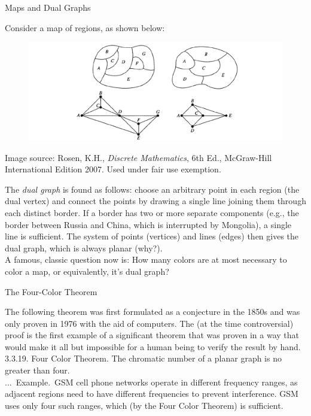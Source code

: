 \documentclass[smaller,hyperref={CJKbookmarks=true}]{beamer}
\newcounter{zhuo}[subsection]
\renewcommand{\thezhuo}{\thesection.\thesubsection.\arabic{zhuo}}
\newenvironment{EXAMPLE}{\stepcounter{zhuo}\alert{\!\thezhuo.~Example.\,}}{}
\begin{document}
\begin{frame}{Maps and Dual Graphs}
\begin{spacing}{1.1}
\vspace*{8pt}
Consider a map of regions, as shown below:
\begin{figure}
  \centering
  \includegraphics[width=\textwidth]{graph2}
\end{figure}
\begin{center}
\begin{spacing}{0.5}
\begin{tiny}
Image source: Rosen, K.H., \emph{Discrete Mathematics}, 6th Ed., McGraw-Hill International Edition 2007. Used under fair use
exemption.
\end{tiny}
\end{spacing}
\end{center}
\newpage
The \emph{dual graph} is found as follows: choose an arbitrary point in each
region (the dual vertex) and connect the points by drawing a single line
joining them through each distinct border. If a border has two or more
separate components (e.g., the border between Russia and China, which is
interrupted by Mongolia), a single line is sufficient. The system of points
(vertices) and lines (edges) then gives the dual graph, which is always
planar (why?).\\[5pt]
A famous, classic question now is: How many colors are at most necessary
to color a map, or equivalently, it's dual graph?
\end{spacing}
\end{frame}
\begin{frame}[c]{The Four-Color Theorem}
\begin{spacing}{1.2}
The following theorem was first formulated as a conjecture in the 1850s
and was only proven in 1976 with the aid of computers. The (at the time
controversial) proof is the first example of a significant theorem that was
proven in a way that would make it all but impossible for a human being
to verify the result by hand.\\[5pt]
\alert{3.3.19. Four Color Theorem.} The chromatic number of a planar graph is no greater than four.\\[6pt]
\begin{EXAMPLE}
GSM cell phone networks operate in different frequency
ranges, as adjacent regions need to have different frequencies to prevent
interference. GSM uses only four such ranges, which (by the Four Color
Theorem) is sufficient.
\end{EXAMPLE}
\end{spacing}
\end{frame}
\end{document}

